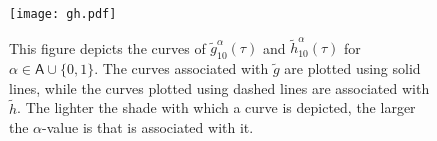\documentclass[twoside,reqno,11pt]{fcaa-var} %
\begin{document}

\begin{figure}[htb]
\centering
\texttt{[image: gh.pdf]}
\caption{This figure depicts the curves of $\widetilde{g}_{10}^{\alpha}(\tau)$ and $\widetilde{h}_{10}^{\alpha}(\tau)$ for $\alpha\in\mathsf{A}\cup\{0,1\}$. The curves associated with $\widetilde{g}$ are plotted using solid lines, while the curves plotted using dashed lines are associated with $\widetilde{h}$. The lighter the shade with which a curve is depicted, the larger the $\alpha$-value is that is associated with it.}
\label{fig:gandh}
\end{figure}
\end{document}
